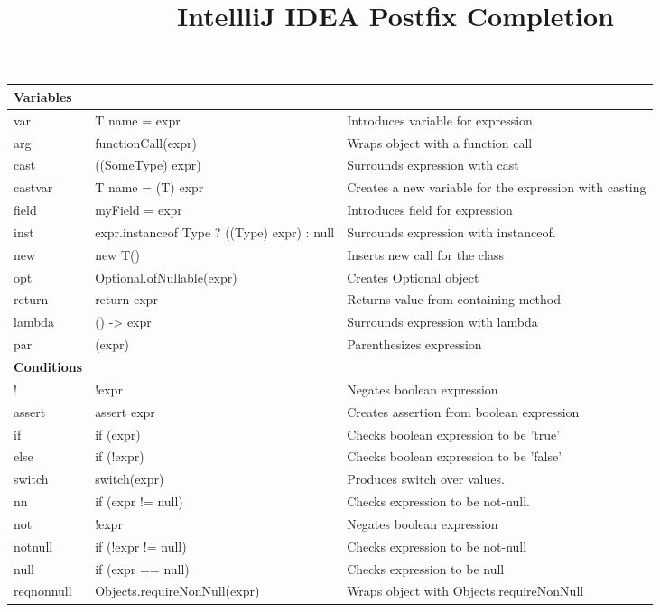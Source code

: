 \documentclass{article}
\title{\vspace{-2cm}\textbf{IntellliJ IDEA Postfix Completion}}
\date{}
\begin{document}

\begin{center}
\begin{tabularx}{\textwidth}[t]{m{3cm}ll}

\arrayrulecolor{green}\hline
\textbf{\textcolor{myGreen}{Variables}} & \\
\hline
var & T name = expr & Introduces variable for expression \\
arg & functionCall(expr) & Wraps object with a function call \\
cast & ((SomeType) expr) & Surrounds expression with cast\\
castvar & T name = (T) expr & Creates a new variable for the expression with casting \\
field & myField = expr & Introduces field for expression \\
inst & expr.instanceof Type ? ((Type) expr) : null & Surrounds expression with instanceof.\\
new & new T() & Inserts new call for the class \\
opt & Optional.ofNullable(expr) & Creates Optional object \\
return & return expr & Returns value from containing method \\
lambda & () -> expr & Surrounds expression with lambda \\
par & (expr) & Parenthesizes expression \\

\arrayrulecolor{green}\hline
\textbf{\textcolor{myGreen}{Conditions}} & \\
\hline
! & !expr & Negates boolean expression \\
assert & assert expr & Creates assertion from boolean expression \\
if & if (expr) & Checks boolean expression to be 'true' \\
else & if (!expr) & Checks boolean expression to be 'false' \\
switch & switch(expr) & Produces switch over values. \\
nn & if (expr != null) & Checks expression to be not-null. \\
not & !expr & Negates boolean expression \\
notnull & if (!expr != null) & Checks expression to be not-null \\
null & if (expr == null) & Checks expression to be null \\
reqnonnull & Objects.requireNonNull(expr) & Wraps object with Objects.requireNonNull \\


\end{tabularx}
\end{center}
\end{document}
